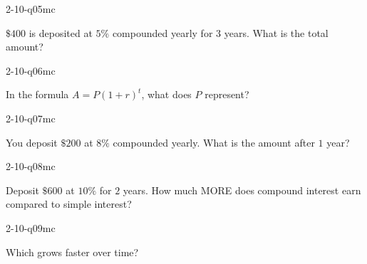 \begin{practiceQuestion}{2-10-q05}{mc}
\begin{questionText}
$\$400$ is deposited at $5\%$ compounded yearly for $3$ years. What is the total amount?
\end{questionText}
\end{practiceQuestion}

\begin{practiceQuestion}{2-10-q06}{mc}
\begin{questionText}
In the formula $A = P(1 + r)^t$, what does $P$ represent?
\end{questionText}
\end{practiceQuestion}

\begin{practiceQuestion}{2-10-q07}{mc}
\begin{questionText}
You deposit $\$200$ at $8\%$ compounded yearly. What is the amount after $1$ year?
\end{questionText}
\end{practiceQuestion}

\begin{practiceQuestion}{2-10-q08}{mc}
\begin{questionText}
Deposit $\$600$ at $10\%$ for $2$ years. How much MORE does compound interest earn compared to simple interest?
\end{questionText}
\end{practiceQuestion}

\begin{practiceQuestion}{2-10-q09}{mc}
\begin{questionText}
Which grows faster over time?
\end{questionText}
\end{practiceQuestion}

